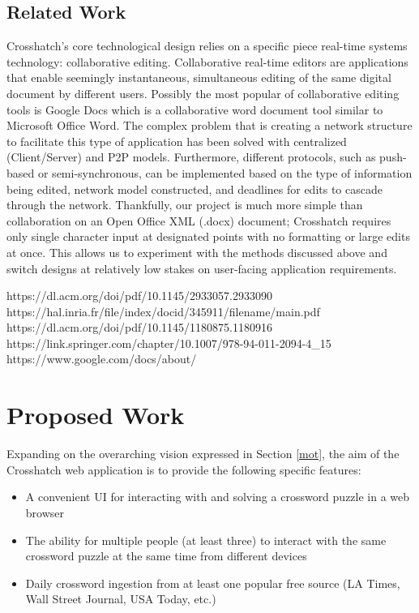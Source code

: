\documentclass{article}
\begin{document}
\subsection{Related Work}
Crosshatch's core technological design relies on a specific piece real-time systems technology: collaborative editing. 
Collaborative real-time editors are applications that enable seemingly instantaneous, simultaneous editing 
of the same digital document by different users.
Possibly the most popular of collaborative editing tools is Google Docs which is a collaborative
word document tool similar to Microsoft Office Word.
The complex problem that is creating a network structure to facilitate this type of application has been solved with centralized (Client/Server)
and P2P models.
Furthermore, different protocols, such as push-based or semi-synchronous, can be implemented based on the type of information being edited,
network model constructed, and deadlines for edits to cascade through the network.
Thankfully, our project is much more simple than collaboration on an Open Office XML (.docx) document; Crosshatch requires only 
single character input at designated points with no formatting or large edits at once. 
This allows us to experiment with the methods discussed above and switch designs 
at relatively low stakes on user-facing application requirements. 

https://dl.acm.org/doi/pdf/10.1145/2933057.2933090
https://hal.inria.fr/file/index/docid/345911/filename/main.pdf
https://dl.acm.org/doi/pdf/10.1145/1180875.1180916
https://link.springer.com/chapter/10.1007/978-94-011-2094-4\_15
https://www.google.com/docs/about/

\section{Proposed Work}
Expanding on the overarching vision expressed in Section \ref{mot}, the aim of the Crosshatch web application is to provide the following
specific features:
\begin{itemize}
  \item A convenient UI for interacting with and solving a crossword puzzle in a web browser
  \item The ability for multiple people (at least three) to interact with the same crossword puzzle at the same time from different devices
  \item Daily crossword ingestion from at least one popular free source (LA Times, Wall Street Journal, USA Today, etc.)
\end{itemize}
\end{document}
